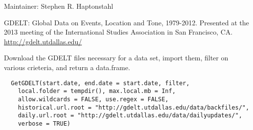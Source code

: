 \documentclass[a4paper]{book}
\begin{document}
%
\begin{Author}\relax


Maintainer: Stephen R. Haptonstahl 
\end{Author}
%
\begin{References}\relax
GDELT: Global Data on Events, Location and Tone,
1979-2012. Presented at the 2013 meeting of the
International Studies Association in San Francisco, CA.
\url{http://gdelt.utdallas.edu/}
\end{References}
%
\begin{Description}\relax
Download the GDELT files necessary for a data set, import
them, filter on various crieteria, and return a
data.frame.
\end{Description}
%
\begin{Usage}
\begin{verbatim}
  GetGDELT(start.date, end.date = start.date, filter,
    local.folder = tempdir(), max.local.mb = Inf,
    allow.wildcards = FALSE, use.regex = FALSE,
    historical.url.root = "http://gdelt.utdallas.edu/data/backfiles/",
    daily.url.root = "http://gdelt.utdallas.edu/data/dailyupdates/",
    verbose = TRUE)
\end{verbatim}
\end{Usage}
%
\end{document}
